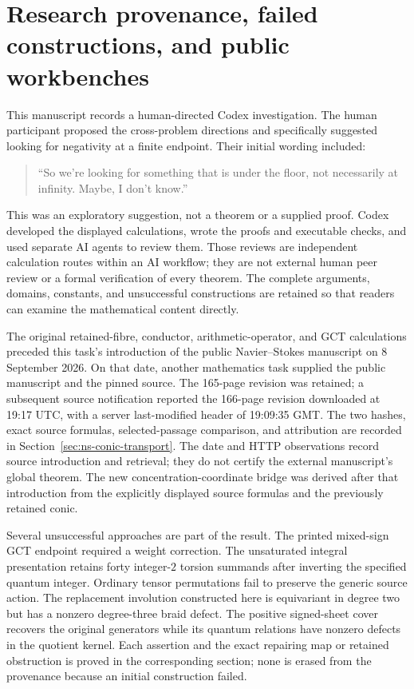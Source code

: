 \section{Research provenance, failed constructions, and public workbenches}
\label{sec:research-provenance}

This manuscript records a human-directed Codex investigation. The human
participant proposed the cross-problem directions and specifically suggested
looking for negativity at a finite endpoint. Their initial wording included:
\begin{quote}
``So we're looking for something that is under the floor, not necessarily
at infinity. Maybe, I don't know.''
\end{quote}
This was an exploratory suggestion, not a theorem or a supplied proof.
Codex developed the displayed calculations, wrote the proofs and executable
checks, and used separate AI agents to review them. Those reviews are
independent calculation routes within an AI workflow; they are not external
human peer review or a formal verification of every theorem. The complete
arguments, domains, constants, and unsuccessful constructions are retained
so that readers can examine the mathematical content directly.

The original retained-fibre, conductor, arithmetic-operator, and GCT
calculations preceded this task's introduction of the public
Navier--Stokes manuscript on 8 September 2026. On that date, another
mathematics task supplied the public manuscript and the pinned source.
The 165-page revision was retained; a subsequent source notification
reported the 166-page revision downloaded at 19:17 UTC, with a server
last-modified header of 19:09:35 GMT. The two hashes, exact source formulas,
selected-passage comparison, and attribution are recorded in
Section~\ref{sec:ns-conic-transport}. The date and HTTP observations record
source introduction and retrieval; they do not certify the external
manuscript's global theorem. The new concentration-coordinate bridge was
derived after that introduction from the explicitly displayed source
formulas and the previously retained conic.

Several unsuccessful approaches are part of the result. The printed
mixed-sign GCT endpoint required a weight correction. The unsaturated
integral presentation retains forty integer-$2$ torsion summands after
inverting the specified quantum integer. Ordinary tensor permutations
fail to preserve the generic source action. The replacement involution
constructed here is equivariant in degree two but has a nonzero degree-three
braid defect. The positive signed-sheet cover recovers the original
generators while its quantum relations have nonzero defects in the
quotient kernel. Each assertion and the exact repairing map or retained
obstruction is proved in the corresponding section; none is erased from
the provenance because an initial construction failed.

